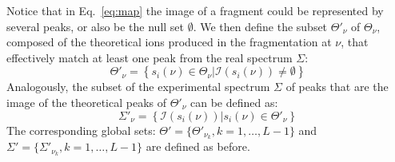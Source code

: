  Notice that in Eq.~\ref{eq:map} the image of a fragment could be represented by
several peaks, or also be the null set $\emptyset$. We then define
the subset $\Theta'_\nu$ of $\Theta_\nu$,  composed of  the
theoretical ions  produced in the fragmentation at $\nu$, that effectively match
at least one peak from the real
spectrum $\Sigma$:
\begin{equation}
\Theta'_\nu=%
\left\{
s_i(\nu)\in\Theta_\nu \vert
\mathcal I(s_i (\nu)) \neq \emptyset
\right\}
\end{equation}
Analogously,  the subset of the experimental spectrum $\Sigma$ of peaks that are the image of 
the theoretical peaks of $\Theta'_\nu$ can be defined as:
\begin{equation}
\Sigma'_\nu=%
\left\{
\mathcal I(s_i(\nu)) \vert s_i(\nu)\in\Theta'_\nu \right\}
\end{equation}
The corresponding global sets: $\Theta'=\{\Theta'_{\nu_k}, k=1,\dots,L-1\}$ and
$\Sigma'=\{\Sigma'_{\nu_k}, k=1,\dots,L-1\}$ are defined as before.

